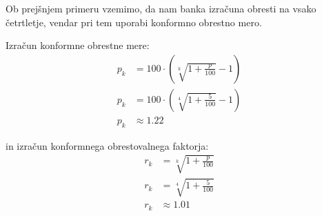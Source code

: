 \documentclass[12pt]{article}
\begin{document}
        Ob prejšnjem primeru vzemimo, da nam banka izračuna obresti na vsako četrtletje,
        vendar pri tem uporabi konformno obrestno mero.

        Izračun konformne obrestne mere:
        \begin{equation}
            \begin{split}
                p_k & = 100 \cdot (\sqrt[k]{1 + \frac{p}{100}} - 1) \\
                p_k & = 100 \cdot (\sqrt[4]{1 + \frac{5}{100}} - 1) \\
                p_k & \approx 1.22
            \end{split}
        \end{equation}

        in izračun konformnega obrestovalnega faktorja:
        \begin{equation}
            \begin{split}
                r_k & = \sqrt[k]{1 + \frac{p}{100}} \\
                r_k & = \sqrt[4]{1 + \frac{5}{100}} \\
                r_k & \approx 1.01
            \end{split}
        \end{equation}
\end{document}

